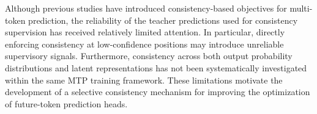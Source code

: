 Although previous studies \cite{samragh2025future} have introduced consistency-based objectives for multi-token prediction, the reliability of the teacher predictions used for consistency supervision has received relatively limited attention. In particular, directly enforcing consistency at low-confidence positions may introduce unreliable supervisory signals. Furthermore, consistency across both output probability distributions and latent representations has not been systematically investigated within the same MTP training framework. These limitations motivate the development of a selective consistency mechanism for improving the optimization of future-token prediction heads.